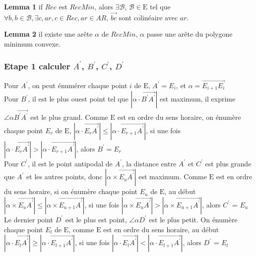 \documentclass[14px]{article}
\begin{document}
\textbf{Lemma 1} if $Rec$ est $RecMin$, alors $\exists \mathcal{B}$, $\mathcal{B} \in \mathrm{E}$ tel que $\forall b, b \in \mathcal{B},\exists c, ar, c \in Rec, ar\in AR$, $\overrightarrow{bc}$ sont colinéaire avec $ar$.

\textbf{Lemma 2} il existe une arête $\alpha$ de $RecMin$, $\alpha$ passe une arête du polygone minimum convexe.


\subsubsection{Etape 1 calculer $A^{\prime}$,  $B^{\prime}$, $C^{\prime}$, $D^{\prime}$}
Pour $A^{\prime}$, on peut énumérer chaque point $i$ de $\mathrm{E}$, $A^{\prime} = E_{i}$,
et $\alpha = \overrightarrow{E_{i+1}E_{i}}$ \\

Pour $B^{\prime}$, il est le plus ouest point tel que $|\alpha \cdot \overrightarrow{B^{\prime}A^{\prime}}|$ est maximum, il exprime $\angle \alpha\overrightarrow{B^{\prime}A^{\prime}}$ est le plus grand. Comme $\mathrm{E}$ est en ordre du sens horaire, on énumère chaque point $E_{r}$ de $\mathrm{E}$, $|\alpha\cdot\overrightarrow{E_{r}A^{\prime}}| \leqslant |\alpha\cdot\overrightarrow{E_{r+1}A^{\prime}}|$, si une fois $|\alpha\cdot\overrightarrow{E_{r}A^{\prime}}| > |\alpha\cdot\overrightarrow{E_{r+1}A^{\prime}}|$, alors $B^{\prime} = E_{r}$\\

Pour $C^{\prime}$, il est le point antipodal de $A^{\prime}$, la distance entre $A^{\prime}$ et $C^{\prime}$ est plus grande que $A^{\prime}$ et les autres points, donc $|\alpha\times\overrightarrow{E_{u}A^{\prime}}|$ est maximum. Comme $\mathrm{E}$ est en ordre du sens horaire, si on énumère chaque point $E_{u}$ de $\mathrm{E}$, au début $|\alpha\times\overrightarrow{E_{u}A^{\prime}}| \leqslant |\alpha\times\overrightarrow{E_{u+1}A^{\prime}}|$, si une fois $|\alpha\times\overrightarrow{E_{u}A^{\prime}}| > |\alpha\times\overrightarrow{E_{u+1}A^{\prime}}|$, alors $C^{\prime}$ = $E_{u}$\\

Le dernier point $D^{\prime}$ est le plus est point, $\angle \alpha D^{\prime}$ est le plus petit. On énumère chaque point $E_{l}$ de $\mathrm{E}$, comme $\mathrm{E}$ est en ordre du sens horaire, au début $|\alpha\cdot\overrightarrow{E_{l}A^{\prime}}| \geq|\alpha\cdot\overrightarrow{E_{l+1}A^{\prime}}|$, si une fois $|\alpha\cdot\overrightarrow{E_{l}A^{\prime}}| < |\alpha\cdot\overrightarrow{E_{l+1}A^{\prime}}|$, alors $D^{\prime}$ = $E_{l}$\\
\end{document}
